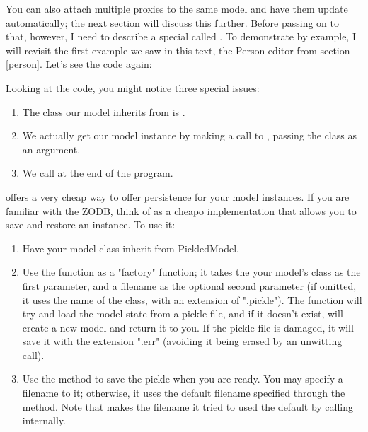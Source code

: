 \documentclass[a4paper]{howto}
\begin{document}
You can also attach multiple proxies to the same model and have them
update automatically; the next section will discuss this further. Before
passing on to that, however, I need to describe a special 
called . To demonstrate by example, I will revisit
the first example we saw in this text, the Person editor from section
\ref{person}. Let's see the code again:



Looking at the code, you might notice three special issues:

\begin{enumerate}
\item The class our model inherits from is .
\item We actually get our model instance by making a call to
, passing the class  as
an argument.
\item We call  at the end of the program.
\end{enumerate}

 offers a very cheap way to offer persistence for
your model instances. If you are familiar with the ZODB, think of
 as a cheapo implementation that allows you to save
and restore an instance. To use it:

\begin{enumerate}
\item Have your model class inherit from PickledModel.

\item Use the  function as a "factory" function;
it takes the your model's class as the first parameter, and a filename
as the optional second parameter (if omitted, it uses the name of the
class, with an extension of ".pickle"). The function will try and load
the model state from a pickle file, and if it doesn't exist, will create
a new model and return it to you. If the pickle file is damaged, it will
save it with the extension ".err" (avoiding it being erased by an
unwitting  call).

\item Use the  method to save the pickle when you are
ready. You may specify a filename to it; otherwise, it uses the default
filename specified through the  method. Note that
 makes the filename it tried to used the default
by calling  internally.
\end{enumerate}
\end{document}
